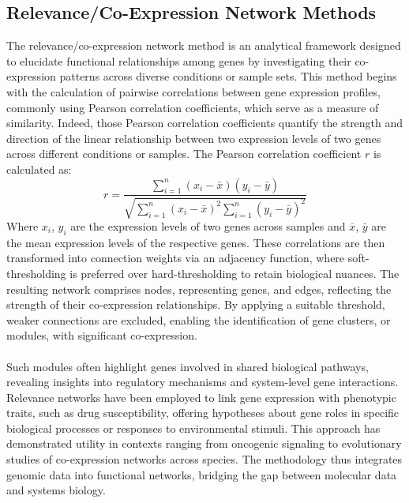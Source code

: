 \subsection{Relevance/Co-Expression Network Methods}\label{subsec:relevance-co-expression-network-methods}

The relevance/co-expression network method is an analytical framework designed to elucidate functional relationships among genes by investigating their co-expression patterns across diverse conditions or sample sets.
This method begins with the calculation of pairwise correlations between gene expression profiles, commonly using Pearson correlation coefficients, which serve as a measure of similarity\cite{zhang_general_2005}.
Indeed, those Pearson correlation coefficients quantify the strength and direction of the linear relationship between two expression levels of two genes across different conditions or samples.
The Pearson correlation coefficient $r$ is calculated as:
\[r = \frac{\sum_{i=1}^{n} (x_i - \bar{x})(y_i - \bar{y})}{\sqrt{\sum_{i=1}^{n} (x_i - \bar{x})^2 \sum_{i=1}^{n} (y_i - \bar{y})^2}}\]
Where $x_i$, $y_i$ are the expression levels of two genes across samples and $\bar{x}$, $\bar{y}$ are the mean expression levels of the respective genes.
These correlations are then transformed into connection weights via an adjacency function, where soft-thresholding is preferred over hard-thresholding to retain biological nuances\cite{butte_discovering_2000, oldham_conservation_2006}.
The resulting network comprises nodes, representing genes, and edges, reflecting the strength of their co-expression relationships.
By applying a suitable threshold, weaker connections are excluded, enabling the identification of gene clusters, or modules, with significant co-expression\cite{schmitt_elucidation_2004}.
\\\\
Such modules often highlight genes involved in shared biological pathways, revealing insights into regulatory mechanisms and system-level gene interactions\cite{horvath_analysis_2006}.
Relevance networks have been employed to link gene expression with phenotypic traits, such as drug susceptibility, offering hypotheses about gene roles in specific biological processes or responses to environmental stimuli\cite{butte_discovering_2000}.
This approach has demonstrated utility in contexts ranging from oncogenic signaling to evolutionary studies of co-expression networks across species\cite{oldham_conservation_2006}.
The methodology thus integrates genomic data into functional networks, bridging the gap between molecular data and systems biology.
\\\\

